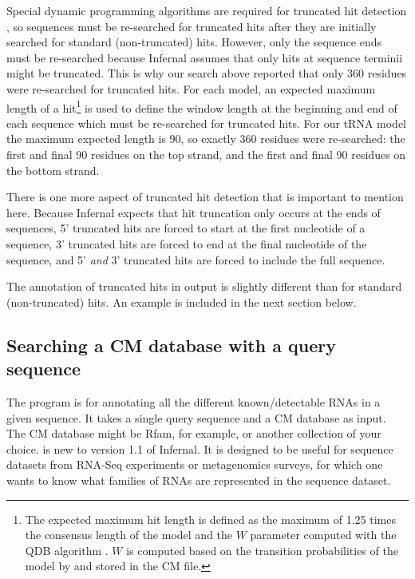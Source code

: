 Special dynamic programming algorithms are required for truncated hit
detection \citep{KolbeEddy09}, so sequences must be re-searched for
truncated hits after they are initially searched for standard
(non-truncated) hits. However, only the sequence ends must be
re-searched because Infernal assumes that only hits at sequence
terminii might be truncated. This is why our search above reported
that only 360 residues were re-searched for truncated hits. For each
model, an expected maximum length of a hit\footnote{The expected
  maximum hit length is defined as the maximum of 1.25 times the
  consensus length of the model and the $W$ parameter computed with
  the QDB algorithm \citep{NawrockiEddy07}. $W$ is computed based on
  the transition probabilities of the model by  and
  stored in the CM file.} 
is used to define the window length at the
beginning and end of each sequence which must be re-searched for
truncated hits. For our tRNA model the maximum expected length is
90, so exactly 360 residues were re-searched: the first and final 90
residues on the top strand, and the first and final 90 residues on
the bottom strand.

There is one more aspect of truncated hit detection that is important
to mention here. Because Infernal expects that hit truncation only
occurs at the ends of sequences, 5' truncated hits are forced to start
at the first nucleotide of a sequence, 3' truncated hits are forced to
end at the final nucleotide of the sequence, and 5' \emph{and} 3'
truncated hits are forced to include the full sequence.

The annotation of truncated hits in  output is slightly
different than for standard (non-truncated) hits. An example is
included in the next section below.

\subsection{Searching a CM database with a query sequence}

The  program is for annotating all the different
known/detectable RNAs in a given sequence. It takes a single query
sequence and a CM database as input. The CM database might be Rfam,
for example, or another collection of your choice.  is
new to version 1.1 of Infernal. It is designed to be useful for
sequence datasets from RNA-Seq experiments or metagenomics surveys,
for which one wants to know what families of RNAs are represented in
the sequence dataset.

